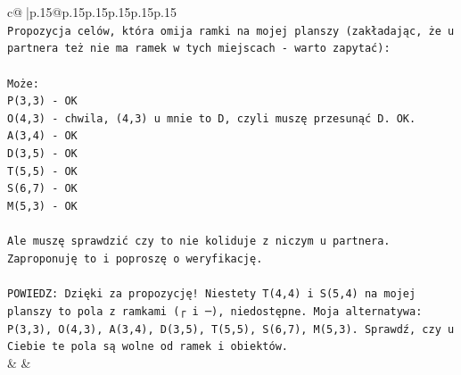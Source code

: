 \documentclass{article}
\begin{document}
{\begin{supertabular}{c@{$\;$}|p{.15\linewidth}@{}p{.15\linewidth}p{.15\linewidth}p{.15\linewidth}p{.15\linewidth}p{.15\linewidth}}
{{{\\ 
\texttt{Propozycja celów, która omija ramki na mojej planszy (zakładając, że u partnera też nie ma ramek w tych miejscach {-} warto zapytać):} \\
\\ 
\texttt{Może:} \\
\texttt{P(3,3) {-} OK} \\
\texttt{O(4,3) {-} chwila, (4,3) u mnie to D, czyli muszę przesunąć D. OK.} \\
\texttt{A(3,4) {-} OK} \\
\texttt{D(3,5) {-} OK} \\
\texttt{T(5,5) {-} OK} \\
\texttt{S(6,7) {-} OK} \\
\texttt{M(5,3) {-} OK} \\
\\ 
\texttt{Ale muszę sprawdzić czy to nie koliduje z niczym u partnera. Zaproponuję to i poproszę o weryfikację.} \\
\\ 
\texttt{POWIEDZ: Dzięki za propozycję! Niestety T(4,4) i S(5,4) na mojej planszy to pola z ramkami (┌ i ─), niedostępne. Moja alternatywa: P(3,3), O(4,3), A(3,4), D(3,5), T(5,5), S(6,7), M(5,3). Sprawdź, czy u Ciebie te pola są wolne od ramek i obiektów.} \\
            }
        }
    }
    & & \\ \\


\end{supertabular}}
\end{document}

